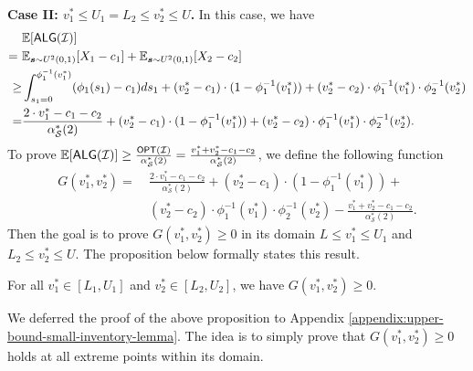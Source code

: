 \textbf{\textbf{Case II}: $v^{*}_{1} \leq U_{1} = L_{2} \leq v^{*}_{2} \leq U$.} In this case,  we have  
    \begin{align*}
           & \mathbb{E}[\textsf{ALG}(\mathcal{I})] \\
        =\ & \mathbb{E}_{\boldsymbol{s} \sim U^{2}(0,1)}[X_{1} - c_{1}] + \mathbb{E}_{\boldsymbol{s} \sim U^{2}(0,1)}[X_{2} - c_{2}] \\
         \ge & \int_{s_{1}=0}^{\phi_{1}^{-1}(v^{*}_{1})} (\phi_{1}(s_{1})-c_1) ds_{1}+ (v^{*}_{2}-c_{1}) \cdot (1-\phi^{-1}_{1}(v^{*}_{1})) + (v^{*}_{2}-c_{2})\cdot \phi_{1}^{-1}(v^{*}_{1})\cdot \phi_{2}^{-1}(v^{*}_{2}) \\
         = & \frac{2\cdot v^{*}_{1}-c_{1}-c_{2}}{\alpha_{\mathcal{S}}^*(2)} + (v^{*}_{2}-c_{1}) \cdot (1-\phi^{-1}_{1}(v^{*}_{1})) + (v^{*}_{2}-c_{2})\cdot \phi_{1}^{-1}(v^{*}_{1})\cdot \phi_{2}^{-1}(v^{*}_{2}).
    \end{align*}
    To prove $\mathbb{E}[\textsf{ALG}(\mathcal{I})] \ge \frac{\textsf{OPT}(\mathcal{I})}{\alpha_{\mathcal{S}}^*(2)}= \frac{v^{*}_{1}+v^{*}_{2}-c_1-c_2}{\alpha_{\mathcal{S}}^*(2)}$, we define the following function
    \begin{align*}
    G(v^{*}_{1},v^{*}_{2}) = \ & \frac{2\cdot v^{*}_{1}-c_{1}-c_{2}}{\alpha_{\mathcal{S}}^*(2)} + (v^{*}_{2}-c_{1}) \cdot (1-\phi^{-1}_{1}(v^{*}_{1}))+ \\
    & (v^{*}_{2}-c_{2})\cdot \phi_{1}^{-1}(v^{*}_{1})\cdot \phi_{2}^{-1}(v^{*}_{2}) - \frac{v^{*}_{1}+v^{*}_{2}-c_1-c_2}{\alpha_{\mathcal{S}}^*(2)}.
    \end{align*}
    Then the goal is to prove $  G(v^{*}_{1},v^{*}_{2}) \ge 0 $ in its domain $L \leq v^{*}_{1}\leq U_{1}$ and $L_{2} \leq v^{*}_{2}\leq U$. The proposition below formally states this result.
    \begin{proposition}
        \label{upper-bound-small-inventory-lemma}
    For all $ v^{*}_{1} \in [L_{1},U_{1}]$  and $v^{*}_{2} \in  [L_{2},U_{2}]$, we have $  G(v^{*}_{1},v^{*}_{2}) \ge 0 $.
    \end{proposition} 
   We deferred the proof of the above proposition to Appendix \ref{appendix:upper-bound-small-inventory-lemma}. The idea is to simply prove that $  G(v^{*}_{1},v^{*}_{2}) \ge 0 $ holds at all extreme points within its domain.
   

